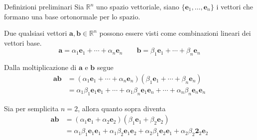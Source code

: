 \begin{frame}{Definizioni preliminari}
    Sia \(\mathbb{R}^{n}\) uno spazio vettoriale, siano  
    \(\{\mathbf{e}_{1}, \ldots, \mathbf{e}_{n}\}\) i vettori che formano 
    una base ortonormale per lo spazio.

    Due qualsiasi vettori \(\mathbf{a}, \mathbf{b} \in \mathbb{R}^{n}\)
    possono essere visti come combinazioni lineari dei vettori base.
    \[
        \mathbf{a} = \alpha_{1}\mathbf{e}_{1} +
            \cdots + \alpha_{n}\mathbf{e}_{n} \qquad
        \mathbf{b} = \beta_{1}\mathbf{e}_{1} +
            \cdots + \beta_{n}\mathbf{e}_{n}
    \] 
\end{frame}
\begin{frame}
    Dalla moltiplicazione di \(\mathbf{a} \text{ e } \mathbf{b}\) segue
    \[\begin{aligned}
        \mathbf{ab} & = (\alpha_{1}\mathbf{e}_{1} +
            \cdots + \alpha_{n}\mathbf{e}_{n})
            (\beta_{1}\mathbf{e}_{1} +
            \cdots + \beta_{n}\mathbf{e}_{n}) \\
            & = \alpha_{1}\beta_{1}\mathbf{e}_{1}\mathbf{e}_{1} +
                \cdots + \alpha_{1}\beta_{n}\mathbf{e}_{1}\mathbf{e}_{n} +
                \cdots + \alpha_{n}\beta_{n}\mathbf{e}_{n}\mathbf{e}_{n}
    \end{aligned}\]

    Sia per semplicita \(n = 2\), allora quanto sopra diventa
    \begin{equation}\label{eq:1}
        \begin{aligned}
            \mathbf{ab} & = (\alpha_{1}\mathbf{e}_{1} + \alpha_{2}\mathbf{e}_{2})
                (\beta_{1}\mathbf{e}_{1} + \beta_{2}\mathbf{e}_{2}) \\
                & = \alpha_{1}\beta_{1}\mathbf{e}_{1}\mathbf{e}_{1} 
                + \alpha_{1}\beta_{2}\mathbf{e}_{1}\mathbf{e}_{2}
                + \alpha_{2}\beta_{1}\mathbf{e}_{2}\mathbf{e}_{1} 
                + \alpha_{2}\beta_{2}\mathbf{2}_{2}\mathbf{e}_{2} 
        \end{aligned}
    \end{equation}


\end{frame}
